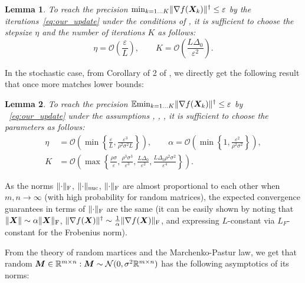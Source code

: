 \documentclass{article} %
\newtheorem{lemma}{Lemma}
\newcommand{\norm}[1]{\lVert #1\rVert}
\renewcommand{\epsilon}{\varepsilon}
\newcommand{\Rmn}{\R^{m\times n}}
\newcommand{\cN}{\mathcal{N}}
\newcommand{\cO}{\mathcal{O}}
\DeclarePairedDelimiter{\normf}{\|}{\|_\mathrm{F}}
\DeclarePairedDelimiter{\normn}{\|}{\|_{\mathrm{nuc}}}
\begin{document}
    \begin{lemma}\label{lemma:no_noise_tr}
    To reach the precision $\min_{k=1\ldots K} \norm{\nabla f(\mX_k)}^\dagger \leq \epsilon$ by the iterations~\eqref{eq:our_update} under the conditions of , it is sufficient to choose the stepsize $\eta$ and the number of iterations $K$ as follows:
    \begin{equation}\label{eq:unstoch_tr}
      \eta = \cO\left(\frac{\epsilon}{L}\right),\qquad K = \cO\left(\frac{L\Delta_0}{\epsilon^2}\right).
    \end{equation}
    \end{lemma}

    In the stochastic case, from Corollary of 2 of \citet{kovalev2025understanding}, we directly get the following result that once more matches lower bounds:

    \begin{lemma}\label{lemma:stoch_tr}
    To reach the precision $\E{\min_{k=1\ldots K} \norm{\nabla f(\mX_k)}^\dagger} \leq \epsilon$ by ~\eqref{eq:our_update} under the assumptions , , , it is sufficient to choose the parameters as follows:
    \begin{align}
        \eta &= \cO\left(\min\left\{\frac{\epsilon}{L}, \frac{\epsilon^3}{\rho^2\sigma^2L}\right\}\right),
        \qquad
        \alpha = \cO\left(\min\left\{1, \frac{\epsilon^2}{\rho^2\sigma^2}\right\}\right),
        \\
        \label{eq:str_K_nonconvex}
        K &= \cO\left(\max\left\{
            \frac{\rho\sigma}{\epsilon},
            \frac{\rho^3\sigma^3}{\epsilon^3},
            \frac{L\Delta_0}{\epsilon^2},
            \frac{L\Delta_0\rho^2\sigma^2}{\epsilon^4}
        \right\}\right).
    \end{align}
    \end{lemma}

    As the norms $\normf{\cdot}$, $\normn{\cdot}$, $\normf{\cdot}$ are almost proportional to each other when $m, n \rightarrow \infty$ (with high probability for random matrices), the expected convergence guarantees in terms of $\normf{\cdot}$ are the same (it can be easily shown by noting that $\norm{\mX}\sim\alpha\normf{\mX}$, $\norm{\nabla f(\mX)}^\dagger \sim \frac{1}{\alpha} \normf{\nabla f(\mX)}$, and expressing $L$-constant via $L_F$-constant for the Frobenius norm).

    From the theory of random martices and the Marchenko-Pastur law, we get that random $\mM \in \Rmn: \mM \sim \cN(0, \sigma^2 \Rmn)$ has the following asymptotics of its norms:
\end{document}
